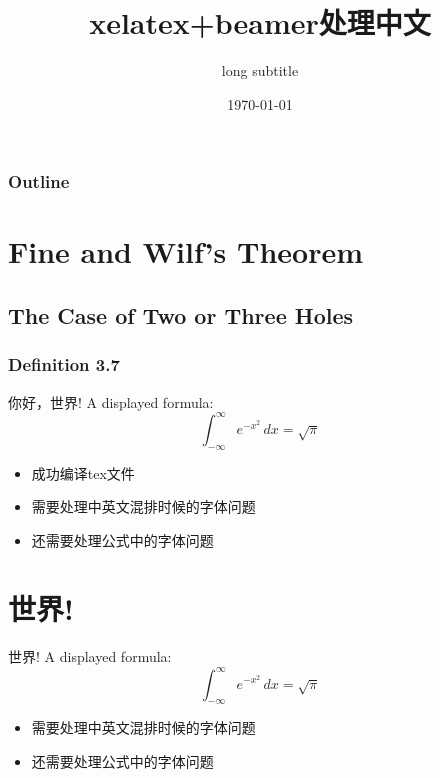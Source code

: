 ﻿\documentclass{beamer}
\begin{document}
  
\title[short title]{xelatex+beamer处理中文}
\subtitle[short subtitle]{long subtitle}
\date[short date]{\today}
\frame{\titlepage}  
\begin{frame}
\frametitle{Outline}
\tableofcontents[part=1,pausesections]
\end{frame}
\section{Fine and Wilf’s Theorem}
\subsection{The Case of Two or Three Holes}
\subsubsection{Definition 3.7}
\begin{frame} {你好，世界!}  
A displayed formula:  
\[  
  \int_{-\infty}^\infty e^{-x^2} \, dx = \sqrt{\pi}  
\]  
\begin{itemize}  
\item 成功编译tex文件  
\item 需要处理中英文混排时候的字体问题    
\item 还需要处理公式中的字体问题  
\end{itemize}  
\end{frame}  
\section{世界!}
\begin{frame} {世界!}  
A displayed formula:  
\[  
  \int_{-\infty}^\infty e^{-x^2} \, dx = \sqrt{\pi}  
\]  
\begin{itemize}   
\item 需要处理中英文混排时候的字体问题    
\item 还需要处理公式中的字体问题 
\end{itemize}  
\end{frame}  
\end{document}
